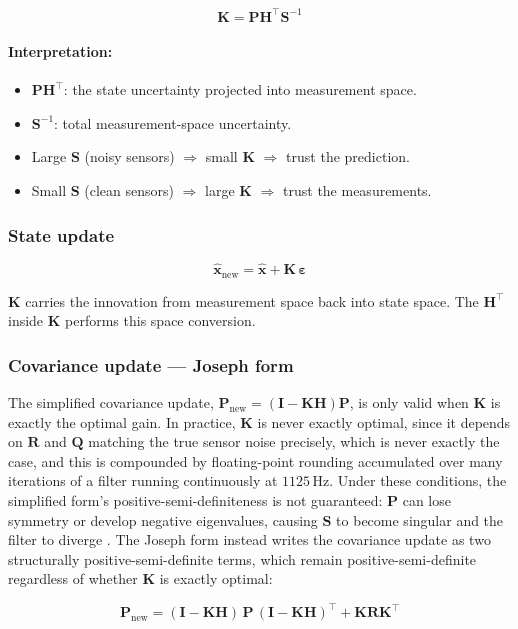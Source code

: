 \documentclass[12pt,a4paper]{article}
\newcommand{\bx}{\bm{x}}
\newcommand{\bP}{\bm{P}}
\newcommand{\bI}{\bm{I}}
\begin{document}
{  \begin{equation}
    \bm{K} = \bP\bm{H}^{\top}\bm{S}^{-1}
    \label{eq:K}
  \end{equation}

\paragraph{Interpretation:}
\begin{itemize}
  \item $\bP\bm{H}^{\top}$: the state uncertainty projected into measurement
        space.
  \item $\bm{S}^{-1}$: total measurement-space uncertainty.
  \item Large $\bm{S}$ (noisy sensors) $\Rightarrow$ small $\bm{K}$
        $\Rightarrow$ trust the prediction.
  \item Small $\bm{S}$ (clean sensors) $\Rightarrow$ large $\bm{K}$
        $\Rightarrow$ trust the measurements.
\end{itemize}
 
\subsubsection{State update}

\begin{equation}
  \hat{\bx}_{\text{new}} = \hat{\bx} + \bm{K}\,\bm{\varepsilon}
  \label{eq:state_update}
\end{equation}

$\bm{K}$ carries the innovation from measurement space back into state space.
The $\bm{H}^{\top}$ inside $\bm{K}$ performs this space conversion.

 \subsubsection{Covariance update — Joseph form}

The simplified covariance update, $\bP_{\text{new}} = (\bI-\bm{K}\bm{H})\bP$,
is only valid when $\bm{K}$ is exactly the optimal gain. In practice,
$\bm{K}$ is never exactly optimal, since it depends on $\bm{R}$ and $\bm{Q}$
matching the true sensor noise precisely, which is never exactly the case,
and this is compounded by floating-point rounding accumulated over many
iterations of a filter running continuously at $1125$\,Hz. Under these
conditions, the simplified form's positive-semi-definiteness is not
guaranteed: $\bP$ can lose symmetry or develop negative eigenvalues,
causing $\bm{S}$ to become singular and the filter to diverge
\citep{grewal2015kalman}. The Joseph form instead writes the covariance
update as two structurally positive-semi-definite terms, which remain
positive-semi-definite regardless of whether $\bm{K}$ is exactly optimal:
\begin{keybox}[title=Joseph Form (numerically stable)]
  \begin{equation}
    \bP_{\text{new}} =
      (\bI - \bm{K}\bm{H})\,\bP\,(\bI - \bm{K}\bm{H})^{\top}
      + \bm{K}\bm{R}\bm{K}^{\top}
    \label{eq:joseph}
  \end{equation}
\end{keybox}

}
\end{document}
